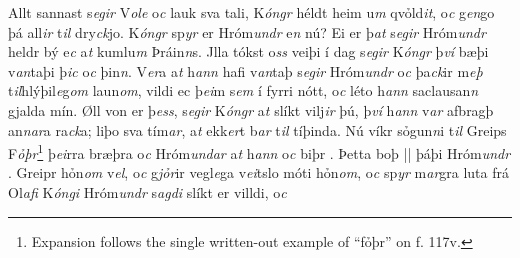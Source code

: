 Allt sannast  s\textit{egir} V\textit{ole} o\textit{c} lauk sva tali,   K\textit{óngr} héldt heim  u\textit{m} qvỏld\textit{it},
o\textit{c} g\textit{en}go þá all\textit{ir} t\textit{il} dry\textit{ck}jo.
K\textit{óngr} sp\textit{yr} er Hróm\textit{undr}  e\textit{n} nú? Ei er þ\textit{at} s\textit{egir} Hróm\textit{undr} heldr
bý e\textit{c} a\textit{t} kumlu\textit{m} Þráin\textit{n}s. Jlla
tókst o\textit{ss} veiþi í dag s\textit{egir} K\textit{óngr} þ\textit{ví} bæþi
v\textit{an}taþi þ\textit{ic} o\textit{c}  þin\textit{n}. 
V\textit{er}a     a\textit{t} h\textit{ann} hafi v\textit{an}taþ s\textit{egir}
Hróm\textit{undr} o\textit{c} þa\textit{ck}ir m\textit{eþ}
t\textit{il}hlýþil\textit{e}g\textit{om} laun\textit{om}, vildi ec  þ\textit{ei}m   s\textit{em}  í fyrri nótt, o\textit{c} léto h\textit{ann} saclausan\textit{n} gjalda mín. Øll von er þ\textit{ess}, s\textit{egir}
K\textit{óngr} a\textit{t} slíkt vilj\textit{ir} þú, 
þ\textit{ví} h\textit{ann} v\textit{ar} afbragþ an\textit{n}\textit{ar}a
ra\textit{ck}a; liþo sva tím\textit{ar}, a\textit{t} ekk\textit{er}t
b\textit{ar} t\textit{il} tíþinda. 
Nú víkr sỏgun\textit{n}i t\textit{il} Greips F\textit{ỏþr}\footnote{Expansion follows the single written-out example of \enquote{fỏþr} on f. 117v.} þ\textit{ei}rra  bræþra o\textit{c}
Hróm\textit{undar} a\textit{t} h\textit{ann}   
o\textit{c} biþr   . 
Þetta boþ 
||
 þáþi Hróm\textit{undr} . 
Greipr   hỏn\textit{om} v\textit{el}, o\textit{c} g\textit{jỏr}ir vegl\textit{e}ga v\textit{ei}tslo móti hỏn\textit{om}, o\textit{c}
sp\textit{yr} m\textit{ar}gra  luta frá Ol\textit{afi}
K\textit{óngi} Hróm\textit{undr} s\textit{agdi} slíkt er villdi, o\textit{c}
